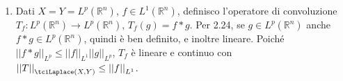 \documentclass{article}
\begin{document}
\begin{enumerate}
\item Dati $X=Y=L^{p}\left( 
\mathbb{R}
^{n}\right) $, $f\in L^{1}\left( 
\mathbb{R}
^{n}\right) $, definisco l'operatore di convoluzione $T_{f}:L^{p}\left( 
\mathbb{R}
^{n}\right) \rightarrow L^{p}\left( 
\mathbb{R}
^{n}\right) $, $T_{f}\left( g\right) =f\ast g$. Per 2.24, se $g\in
L^{p}\left( 
\mathbb{R}
^{n}\right) $ anche $f\ast g\in L^{p}\left( 
\mathbb{R}
^{n}\right) $, quindi \`{e} ben definito, e inoltre lineare. Poich\'{e} $%
\left\vert \left\vert f\ast g\right\vert \right\vert _{L^{p}}\leq \left\vert
\left\vert f\right\vert \right\vert _{L^{1}}\left\vert \left\vert
g\right\vert \right\vert _{L^{p}}$, $T_{f}$ \`{e} lineare e continuo con $%
\left\vert \left\vert T\right\vert \right\vert _{\tciLaplace \left(
X,Y\right) }\leq \left\vert \left\vert f\right\vert \right\vert _{L^{1}}$.


\end{enumerate}
\end{document}
